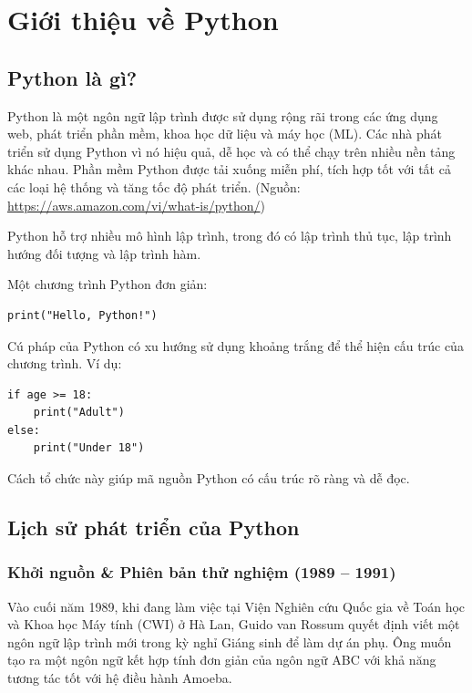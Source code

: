 \chapter{Giới thiệu về Python}
\label{chap:intro}

\section{Python là gì?}

Python là một ngôn ngữ lập trình được sử dụng rộng rãi trong các ứng dụng web, phát triển phần mềm, khoa học dữ liệu và máy học (ML). Các nhà phát triển sử dụng Python vì nó hiệu quả, dễ học và có thể chạy trên nhiều nền tảng khác nhau. Phần mềm Python được tải xuống miễn phí, tích hợp tốt với tất cả các loại hệ thống và tăng tốc độ phát triển. (Nguồn: \url{https://aws.amazon.com/vi/what-is/python/})

Python hỗ trợ nhiều mô hình lập trình, trong đó có lập trình thủ tục, lập trình hướng đối tượng và lập trình hàm. 

Một chương trình Python đơn giản:

\begin{lstlisting}
print("Hello, Python!")
\end{lstlisting}

Cú pháp của Python có xu hướng sử dụng khoảng trắng để thể hiện cấu trúc của chương trình. Ví dụ:

\begin{lstlisting}
if age >= 18:
    print("Adult")
else:
    print("Under 18")
\end{lstlisting}

Cách tổ chức này giúp mã nguồn Python có cấu trúc rõ ràng và dễ đọc.

\section{Lịch sử phát triển của Python}

\subsection{Khởi nguồn \& Phiên bản thử nghiệm (1989 – 1991)}
Vào cuối năm 1989, khi đang làm việc tại Viện Nghiên cứu Quốc gia về Toán học và Khoa học Máy tính (CWI) ở Hà Lan, Guido van Rossum quyết định viết một ngôn ngữ lập trình mới trong kỳ nghỉ Giáng sinh để làm dự án phụ. Ông muốn tạo ra một ngôn ngữ kết hợp tính đơn giản của ngôn ngữ ABC với khả năng tương tác tốt với hệ điều hành Amoeba.


